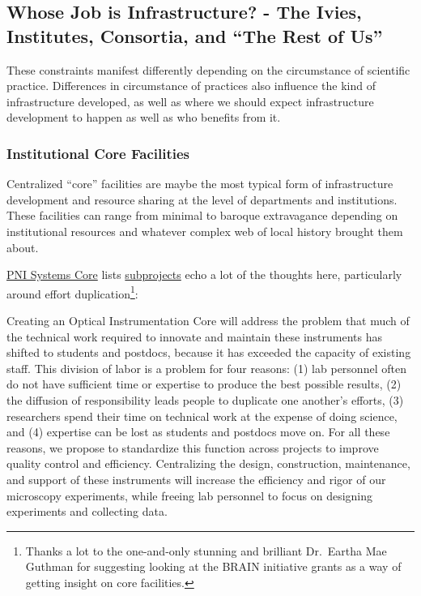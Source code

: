\documentclass[10pt]{article}
\begin{document}
\hypertarget{whose-job-is-infrastructure---the-ivies-institutes-consortia-and-the-rest-of-us}{%
\subsection{Whose Job is Infrastructure? - The Ivies, Institutes,
Consortia, and ``The Rest of
Us''}\label{whose-job-is-infrastructure---the-ivies-institutes-consortia-and-the-rest-of-us}}


\begin{multicols}{2}
 These constraints manifest differently depending on the
circumstance of scientific practice. Differences in circumstance of
practices also influence the kind of infrastructure developed, as well
as where we should expect infrastructure development to happen as well
as who benefits from it.

\hypertarget{institutional-core-facilities}{%
\subsubsection{Institutional Core
Facilities}\label{institutional-core-facilities}}

Centralized ``core'' facilities are maybe the most typical form of
infrastructure development and resource sharing at the level of
departments and institutions. These facilities can range from minimal to
baroque extravagance depending on institutional resources and whatever
complex web of local history brought them about.

\href{https://projectreporter.nih.gov/project_info_details.cfm?aid=9444124}{PNI
Systems Core} lists
\href{https://reporter.nih.gov/project-details/9444124\#sub-Projects}{subprojects}
echo a lot of the thoughts here, particularly around effort
duplication\footnote{Thanks a lot to the one-and-only stunning and
  brilliant Dr.~Eartha Mae Guthman for suggesting looking at the BRAIN
  initiative grants as a way of getting insight on core facilities.}:

\begin{leftbar}
Creating an Optical Instrumentation Core will address the problem that
much of the technical work required to innovate and maintain these
instruments has shifted to students and postdocs, because it has
exceeded the capacity of existing staff. This division of labor is a
problem for four reasons: (1) lab personnel often do not have sufficient
time or expertise to produce the best possible results, (2) the
diffusion of responsibility leads people to duplicate one another's
efforts, (3) researchers spend their time on technical work at the
expense of doing science, and (4) expertise can be lost as students and
postdocs move on. For all these reasons, we propose to standardize this
function across projects to improve quality control and efficiency.
Centralizing the design, construction, maintenance, and support of these
instruments will increase the efficiency and rigor of our microscopy
experiments, while freeing lab personnel to focus on designing
experiments and collecting data.
\end{leftbar}


\end{multicols}
\end{document}
